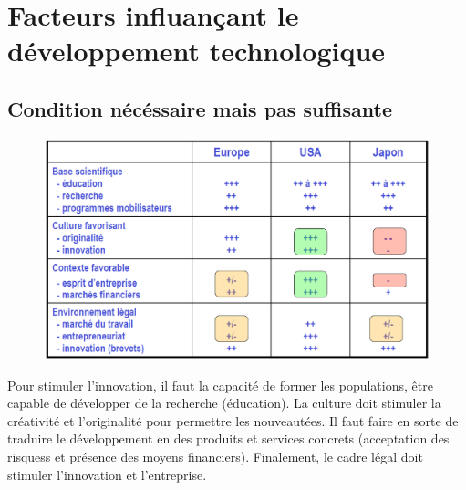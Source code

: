 \section{Facteurs influançant le développement technologique}
\subsection{Condition nécéssaire mais pas suffisante}
\begin{figure}
\includegraphics[scale=0.35]{62}
\end{figure}
Pour stimuler l'innovation, il faut la capacité de former les populations, être capable de développer de la recherche (éducation). La culture doit stimuler la créativité et l'originalité pour permettre les nouveautées. Il faut faire en sorte de traduire le développement en des produits et services concrets (acceptation des risquess et présence des moyens financiers). Finalement, le cadre légal doit stimuler l'innovation et l'entreprise.  

